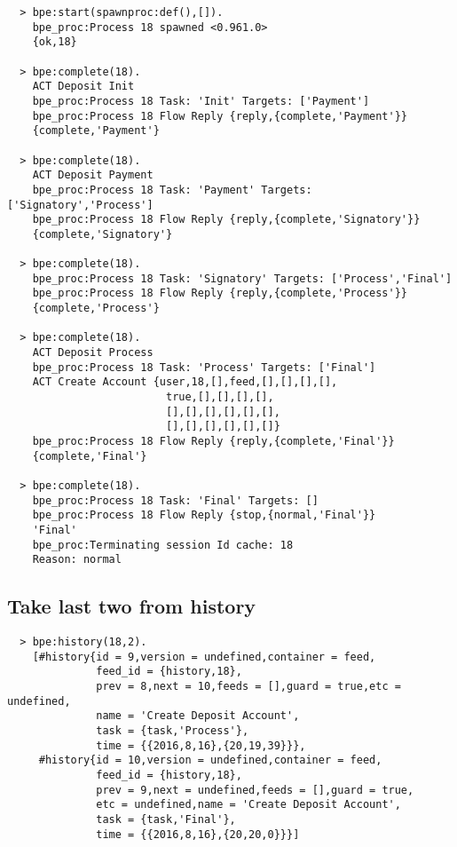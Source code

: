 \vspace{1\baselineskip}
\begin{lstlisting}
  > bpe:start(spawnproc:def(),[]).
    bpe_proc:Process 18 spawned <0.961.0>
    {ok,18}

  > bpe:complete(18).
    ACT Deposit Init
    bpe_proc:Process 18 Task: 'Init' Targets: ['Payment']
    bpe_proc:Process 18 Flow Reply {reply,{complete,'Payment'}}
    {complete,'Payment'}

  > bpe:complete(18).
    ACT Deposit Payment
    bpe_proc:Process 18 Task: 'Payment' Targets: ['Signatory','Process']
    bpe_proc:Process 18 Flow Reply {reply,{complete,'Signatory'}}
    {complete,'Signatory'}

  > bpe:complete(18).
    bpe_proc:Process 18 Task: 'Signatory' Targets: ['Process','Final']
    bpe_proc:Process 18 Flow Reply {reply,{complete,'Process'}}
    {complete,'Process'}

  > bpe:complete(18).
    ACT Deposit Process
    bpe_proc:Process 18 Task: 'Process' Targets: ['Final']
    ACT Create Account {user,18,[],feed,[],[],[],[],
                         true,[],[],[],[],
                         [],[],[],[],[],[],
                         [],[],[],[],[],[]}
    bpe_proc:Process 18 Flow Reply {reply,{complete,'Final'}}
    {complete,'Final'}

  > bpe:complete(18).
    bpe_proc:Process 18 Task: 'Final' Targets: []
    bpe_proc:Process 18 Flow Reply {stop,{normal,'Final'}}
    'Final'
    bpe_proc:Terminating session Id cache: 18
    Reason: normal

\end{lstlisting}

\newpage

\subsection*{Take last two from history}
\begin{lstlisting}
  > bpe:history(18,2).
    [#history{id = 9,version = undefined,container = feed,
              feed_id = {history,18},
              prev = 8,next = 10,feeds = [],guard = true,etc = undefined,
              name = 'Create Deposit Account',
              task = {task,'Process'},
              time = {{2016,8,16},{20,19,39}}},
     #history{id = 10,version = undefined,container = feed,
              feed_id = {history,18},
              prev = 9,next = undefined,feeds = [],guard = true,
              etc = undefined,name = 'Create Deposit Account',
              task = {task,'Final'},
              time = {{2016,8,16},{20,20,0}}}]
\end{lstlisting}


